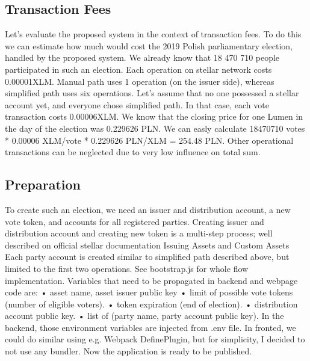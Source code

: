 \documentclass[runningheads]{llncs}
\begin{document}
\subsection{Transaction Fees}
Let’s evaluate the proposed system in the context of transaction fees. To do this we can estimate how much would cost the 2019 Polish parliamentary election, handled by the proposed system. We already know that 18 470 710 people participated in such an election. Each operation on stellar network costs 0.00001XLM. Manual path uses 1 operation (on the issuer side), whereas simplified path uses six operations. Let’s assume that no one possessed a stellar account yet, and everyone chose simplified path. In that case, each vote transaction costs 0.00006XLM. We know that the closing price for one Lumen in the day of the election was 0.229626 PLN. We can easly calculate 18470710 votes * 0.00006 XLM/vote * 0.229626 PLN/XLM = 254.48 PLN. Other operational transactions can be neglected due to very low influence on total sum.

\subsection{Preparation}
To create such an election, we need an issuer and distribution account, a new vote token, and accounts for all registered parties. Creating issuer and distribution account and creating new token is a multi-step process; well described on official stellar documentation Issuing Assets and Custom Assets Each party account is created similar to simplified path described above, but limited to the first two operations. See bootstrap.js for whole flow implementation. Variables that need to be propagated in backend and webpage code are:
• asset name, asset issuer public key
• limit of possible vote tokens (number of eligible voters). • token expiration (end of election).
• distribution account public key.
• list of (party name, party account public key).
In the backend, those environment variables are injected from .env file. In fronted, we could do similar using e.g. Webpack DefinePlugin, but for simplicity, I decided to not use any bundler.
Now the application is ready to be published.
\end{document}
